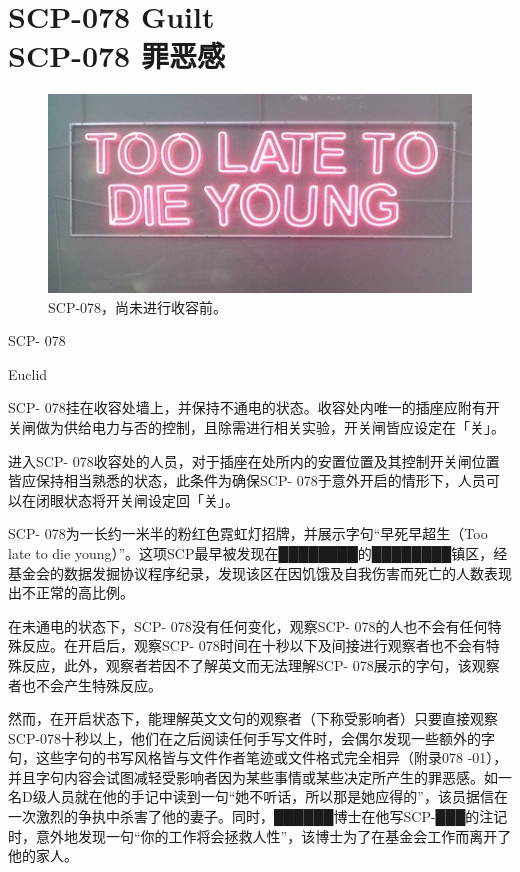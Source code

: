 \chapter[SCP-078 罪恶感]{
    SCP-078 Guilt\\
    SCP-078 罪恶感
}

\label{chap:SCP-078}

\begin{figure}[H]
    \centering
    \includegraphics[width=0.5\linewidth]{images/SCP.078.jpg}
    \caption*{SCP-078，尚未进行收容前。}
\end{figure}

SCP- 078

Euclid

SCP- 078挂在收容处墙上，并保持不通电的状态。收容处内唯一的插座应附有开关闸做为供给电力与否的控制，且除需进行相关实验，开关闸皆应设定在「关」。

进入SCP- 078收容处的人员，对于插座在处所内的安置位置及其控制开关闸位置皆应保持相当熟悉的状态，此条件为确保SCP- 078于意外开启的情形下，人员可以在闭眼状态将开关闸设定回「关」。

SCP- 078为一长约一米半的粉红色霓虹灯招牌，并展示字句“早死早超生（Too late to die young）”。这项SCP最早被发现在████████的████████镇区，经基金会的数据发掘协议程序纪录，发现该区在因饥饿及自我伤害而死亡的人数表现出不正常的高比例。

在未通电的状态下，SCP- 078没有任何变化，观察SCP- 078的人也不会有任何特殊反应。在开启后，观察SCP- 078时间在十秒以下及间接进行观察者也不会有特殊反应，此外，观察者若因不了解英文而无法理解SCP- 078展示的字句，该观察者也不会产生特殊反应。

然而，在开启状态下，能理解英文文句的观察者（下称受影响者）只要直接观察SCP-078十秒以上，他们在之后阅读任何手写文件时，会偶尔发现一些额外的字句，这些字句的书写风格皆与文件作者笔迹或文件格式完全相异（附录078 -01），并且字句内容会试图减轻受影响者因为某些事情或某些决定所产生的罪恶感。如一名D级人员就在他的手记中读到一句“她不听话，所以那是她应得的”，该员据信在一次激烈的争执中杀害了他的妻子。同时，██████博士在他写SCP-███的注记时，意外地发现一句“你的工作将会拯救人性”，该博士为了在基金会工作而离开了他的家人。

